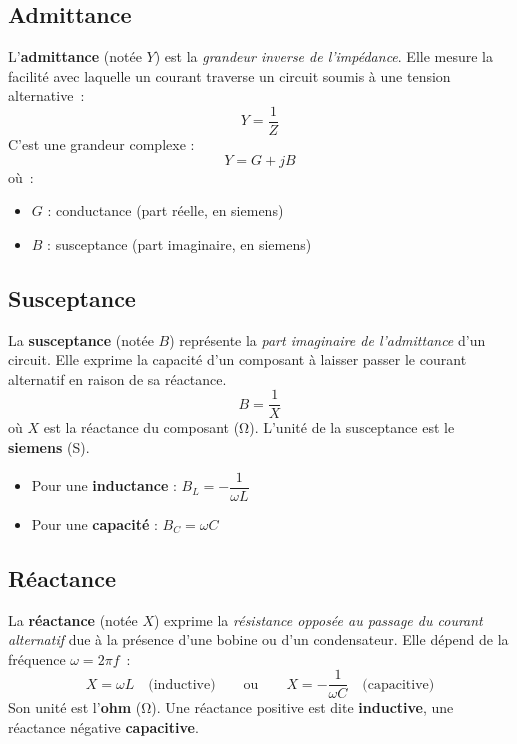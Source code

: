 \subsection{Admittance}
L'\textbf{admittance} (not\'ee $Y$) est la \emph{grandeur inverse de l'imp\'edance}. Elle mesure la facilit\'e avec laquelle un courant traverse un circuit soumis à une tension alternative~:
\[
Y = \frac{1}{Z}
\]
C’est une grandeur complexe :
\[
Y = G + jB
\]
o\`u~:
\begin{itemize}
  \item $G$ : conductance (part r\'eelle, en siemens)
  \item $B$ : susceptance (part imaginaire, en siemens)
\end{itemize}

\subsection{Susceptance}
La \textbf{susceptance} (not\'ee $B$) repr\'esente la \emph{part imaginaire de l'admittance} d'un circuit.
Elle exprime la capacit\'e d'un composant à laisser passer le courant alternatif en raison de sa r\'eactance.
\[
B = \frac{1}{X}
\]
o\`u $X$ est la r\'eactance du composant (\unit{\ohm}).
L'unit\'e de la susceptance est le \textbf{siemens} (\unit{\siemens}).
\begin{itemize}
  \item Pour une \textbf{inductance} : $B_L = -\dfrac{1}{\omega L}$
  \item Pour une \textbf{capacit\'e} : $B_C = \omega C$
\end{itemize}

\subsection{R\'eactance}
La \textbf{r\'eactance} (not\'ee $X$) exprime la \emph{r\'esistance oppos\'ee au passage du courant alternatif} due à la pr\'esence d’une bobine ou d’un condensateur. Elle d\'epend de la fr\'equence $\omega = 2\pi f$~:
\[
X = \omega L \quad \text{(inductive)} \qquad \text{ou} \qquad X = -\frac{1}{\omega C} \quad \text{(capacitive)}
\]
Son unit\'e est l’\textbf{ohm} (\unit{\ohm}). Une r\'eactance positive est dite \textbf{inductive}, une r\'eactance n\'egative \textbf{capacitive}.
